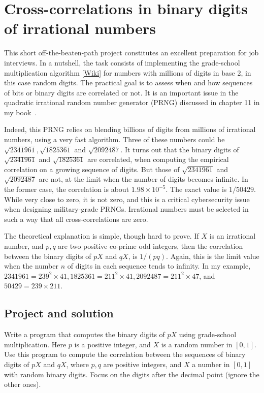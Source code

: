 \documentclass[oneside,10pt]{book}
\begin{document}
\section{Cross-correlations in binary digits of irrational numbers}

This short off-the-beaten-path project constitutes an excellent preparation for job interviews. In a nutshell, the task consists of implementing
 the \textcolor{index}{grade-school multiplication algorithm} [\href{https://en.wikipedia.org/wiki/Multiplication_algorithm}{Wiki}] for numbers with millions of digits in base 2, in this case random digits.
The practical goal is to assess when and how sequences of bits or binary digits are correlated or not. It is an important issue 
in the quadratic irrational \textcolor{index}{random number generator} (PRNG) discussed 
 in chapter 11 in my book~\cite{vgelsevier}. 

Indeed, this PRNG relies on blending billions of digits from millions of irrational numbers, using a very fast algorithm. Three of these numbers could be $\sqrt{2341961}, \sqrt{1825361}$ and $\sqrt{2092487}$. It turns out that
 the binary digits of $\sqrt{2341961}$ and $\sqrt{1825361}$ are correlated, when computing the empirical correlation on a growing
 sequence of digits. But those of $\sqrt{2341961}$ and $\sqrt{2092487}$ are not, 
 at the limit when the number of digits becomes infinite. In the former case, the correlation
 is about $1.98\times 10^{-5}$. The exact value is $1/50429$. While very close to zero,
 it is not zero, and this is a critical cybersecurity issue when designing military-grade PRNGs. Irrational numbers must be selected 
 in such a way that all cross-correlations are zero.

The theoretical explanation is simple, though hard to prove. If $X$ is an irrational number, and $p,q$ are two positive co-prime odd integers, then the correlation between the binary digits of $pX$ and $qX$, is $1/(pq)$. Again, this is the limit value when the number $n$ of digits
 in each sequence tends to infinity. In my example, 
$2341961 = 239^2 \times 41, 1825361 = 211^2 \times 41,
2092487 = 211^2\times 47$, and $50429 = 239\times 211$.

\subsection{Project and solution}
 

Write a program that computes the binary digits of $pX$ using grade-school multiplication. Here $p$ is a positive integer, and $X$ is a random number in $[0, 1]$. Use this program to compute the correlation between the sequences of binary digits of $pX$ and $qX$, where $p,q$ are positive integers, and $X$ a number in $[0, 1]$ with random binary digits. Focus on the digits after the decimal point (ignore the other ones).
\end{document}

